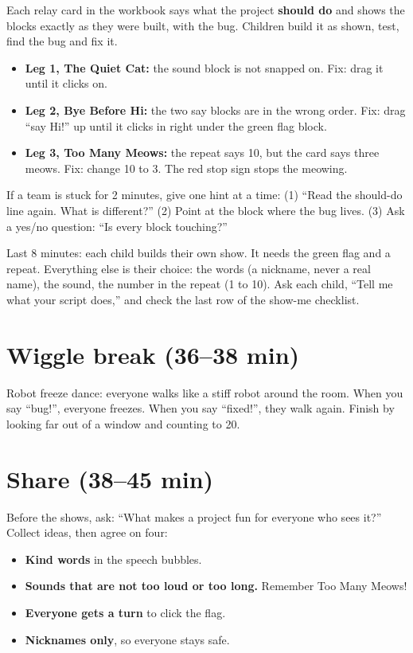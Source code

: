 \begin{bughunt}
Each relay card in the workbook says what the project \textbf{should do} and shows the blocks exactly as they were built, with the bug. Children build it as shown, test, find the bug and fix it.
\begin{itemize}[leftmargin=1.2em,itemsep=1pt]
  \item \textbf{Leg 1, The Quiet Cat:} the sound block is not snapped on. Fix: drag it until it clicks on.
  \item \textbf{Leg 2, Bye Before Hi:} the two say blocks are in the wrong order. Fix: drag \enquote{say Hi!} up until it clicks in right under the green flag block.
  \item \textbf{Leg 3, Too Many Meows:} the repeat says 10, but the card says three meows. Fix: change 10 to 3. The red stop sign stops the meowing.
\end{itemize}
If a team is stuck for 2 minutes, give one hint at a time: (1) \enquote{Read the should-do line again. What is different?} (2) Point at the block where the bug lives. (3) Ask a yes/no question: \enquote{Is every block touching?}
\end{bughunt}

\begin{freebuild}
Last 8 minutes: each child builds their own show. It needs the green flag and a repeat. Everything else is their choice: the words (a nickname, never a real name), the sound, the number in the repeat (1 to 10). Ask each child, \enquote{Tell me what your script does,} and check the last row of the show-me checklist.
\end{freebuild}

\section{Wiggle break (36--38 min)}
Robot freeze dance: everyone walks like a stiff robot around the room. When you say \enquote{bug!}, everyone freezes. When you say \enquote{fixed!}, they walk again. Finish by looking far out of a window and counting to 20.

\section{Share (38--45 min)}
\begin{safety}
Before the shows, ask: \enquote{What makes a project fun for everyone who sees it?} Collect ideas, then agree on four:
\begin{itemize}[leftmargin=1.2em,itemsep=0pt]
  \item \textbf{Kind words} in the speech bubbles.
  \item \textbf{Sounds that are not too loud or too long.} Remember Too Many Meows!
  \item \textbf{Everyone gets a turn} to click the flag.
  \item \textbf{Nicknames only}, so everyone stays safe.
\end{itemize}
\end{safety}


